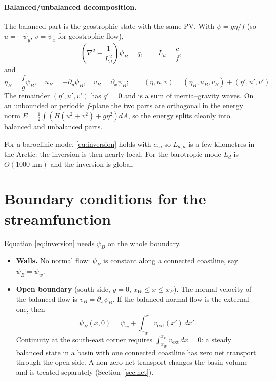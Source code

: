 \documentclass[11pt]{article}
\newcommand{\ext}{\mathrm{ext}}
\begin{document}
\paragraph{Balanced/unbalanced decomposition.} The balanced part is the geostrophic state with the same PV. With
$\psi = g\eta/f$ (so $u=-\psi_y$, $v=\psi_x$ for geostrophic flow),
\begin{equation}
  \left(\nabla^2 - \frac{1}{L_d^2}\right)\psi_B = q,\qquad L_d = \frac{c}{f},
  \label{eq:inversion}
\end{equation}
and
\begin{equation}
  \eta_B = \frac{f}{g}\psi_B,\quad u_B=-\partial_y\psi_B,\quad v_B=\partial_x\psi_B;\qquad
  (\eta,u,v) = (\eta_B,u_B,v_B) + (\eta',u',v').
\end{equation}
The remainder $(\eta',u',v')$ has $q'=0$ and is a sum of inertia--gravity waves. On an unbounded or periodic
$f$-plane the two parts are orthogonal in the energy norm $E=\tfrac12\int\left(H(u^2+v^2)+g\eta^2\right)dA$, so the
energy splits cleanly into balanced and unbalanced parts.

For a baroclinic mode, \eqref{eq:inversion} holds with $c_n$, so $L_{d,n}$ is a few kilometres in the Arctic: the
inversion is then nearly local. For the barotropic mode $L_d$ is $O(1000\text{ km})$ and the inversion is global.

\section{Boundary conditions for the streamfunction}
\label{sec:psibc}

Equation \eqref{eq:inversion} needs $\psi_B$ on the whole boundary.

\begin{itemize}
  \item \textbf{Walls.} No normal flow: $\psi_B$ is constant along a connected coastline, say $\psi_B=\psi_w$.
  \item \textbf{Open boundary} (south side, $y=0$, $x_W\le x\le x_E$). The normal velocity of the balanced flow is
        $v_B = \partial_x\psi_B$. If the balanced normal flow is the external one, then
        \begin{equation}
          \psi_B(x,0) = \psi_w + \int_{x_W}^{x} v_\ext(x')\,dx'.
          \label{eq:psiopen}
        \end{equation}
        Continuity at the south-east corner requires $\int_{x_W}^{x_E} v_\ext\,dx = 0$: a steady balanced state in a
        basin with one connected coastline has zero net transport through the open side. A non-zero net transport
        changes the basin volume and is treated separately (Section~\ref{sec:net}).
\end{itemize}
\end{document}
